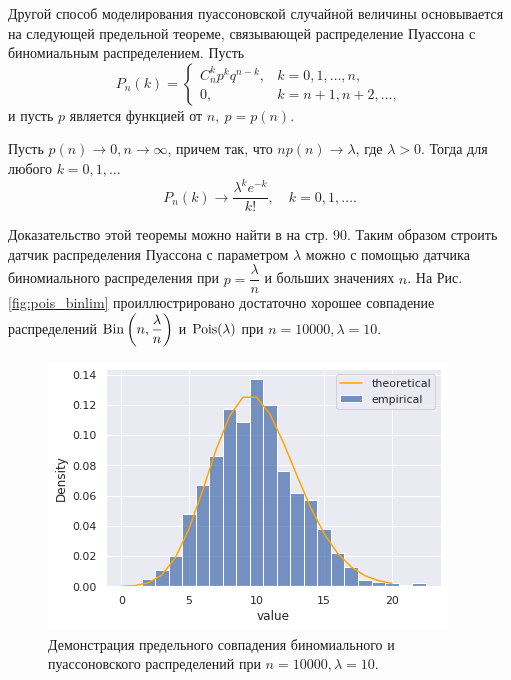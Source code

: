 Другой способ моделирования пуассоновской случайной величины основывается на 
 следующей предельной теореме, связывающей распределение Пуассона с биномиальным
 распределением.
Пусть
$$
P_n(k) = 
\begin{cases}
	C_n^k p^k q^{n-k}, & k = 0, 1, \dots, n,\\
	0, & k = n + 1, n + 2, \dots, 
\end{cases}
$$
и пусть $ p $ является функцией от $ n, \ p = p(n) $.
\begin{theorem}[Пуассона]
	Пусть $ p(n) \to 0, n \to \infty $, причем так, что $ n p(n) \to \lambda $,
	 где $ \lambda > 0 $. Тогда для любого $ k = 0, 1, \dots $
	$$
	P_n(k) \to \dfrac{\lambda^k e^{-k}}{k!}, \quad k = 0, 1, \dots .
	$$
\end{theorem}
Доказательство этой теоремы можно найти в \cite{shir_prob} на стр. 90. Таким
 образом строить датчик распределения Пуассона с параметром $ \lambda $
 можно с помощью датчика биномиального распределения при $ p =
 \dfrac{\lambda}{n} $ и больших значениях $ n $. На Рис.\eqref{fig:pois_binlim}
 проиллюстрировано достаточно хорошее совпадение распределений $ \operatorname{\mathrm{Bin}}\left( n,
 \dfrac{\lambda}{n} \right) $ и $ \operatorname{\mathrm{Pois}}(\lambda) $ при $ n = 10000, \lambda = 10 $.

\begin{figure}[ht]
	\centering
	\includegraphics[width = 0.8\linewidth]{"./resources/pois_binlim.png"}
	\caption{Демонстрация предельного совпадения биномиального и пуассоновского
	 распределений при $ n = 10000, \lambda = 10 $.}
    \label{fig:pois_binlim}
\end{figure}

